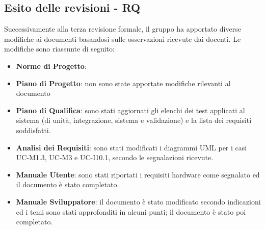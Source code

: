 \subsection{Esito delle revisioni - RQ}	
Successivamente alla terza revisione formale, il gruppo ha apportato diverse modifiche ai documenti basandosi sulle osservazioni ricevute dai docenti. Le modifiche sono riassunte di seguito:
	\begin{itemize}
		\item \textbf{Norme di Progetto}: 
		\item \textbf{Piano di Progetto}: non sono state apportate modifiche rilevanti al documento
		\item \textbf{Piano di Qualifica}: sono stati aggiornati gli elenchi dei test applicati al sistema (di unità, integrazione, sistema e validazione) e la lista dei requisiti soddisfatti. 
		\item \textbf{Analisi dei Requisiti}: sono stati modificati i diagrammi UML per i casi UC-M1.3, UC-M3 e UC-I10.1, secondo le segnalazioni ricevute.
		\item \textbf{Manuale Utente}: sono stati riportati i requisiti hardware come segnalato ed il documento è stato completato.
		\item \textbf{Manuale Sviluppatore}: il documento è stato modificato secondo indicazioni ed i temi sono stati approfonditi in alcuni punti; il documento è stato poi completato.
	\end{itemize}
\newpage
